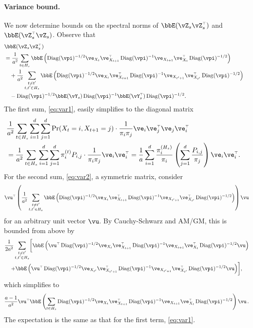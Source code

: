 \paragraph{Variance bound.}
We now determine bounds on the spectral norms of $\bbE(\vZ_s
\vZ_s^\t)$ and $\bbE(\vZ_s^\t \vZ_s)$.
Observe that
\begin{align}
  \lefteqn{
    \bbE(\vZ_s\vZ_s^\t)
  } \notag \\
  & =
  \frac1{a^2} \sum_{t \in H_s}
  \bbE\Parens{
    \Diag(\vpi)^{-1/2}
    \ve_{X_t} \ve_{X_{t+1}}^\t 
    \Diag(\vpi)^{-1}
    \ve_{X_{t+1}} \ve_{X_t}^\t
    \Diag(\vpi)^{-1/2}
  }
  \label{eq:var1}
  \\
  & \quad
  + \frac1{a^2} \sum_{ \substack{ t \neq t' \\ t,t'\in H_s} } 
  \bbE\Parens{
    \Diag(\vpi)^{-1/2}
    \ve_{X_t} \ve_{X_{t+1}}^\t 
    \Diag(\vpi)^{-1}
    \ve_{X_{t'+1}} \ve_{X_{t'}}^\t
    \Diag(\vpi)^{-1/2}
  }
  \label{eq:var2}
  \\
  & \quad
  - \Diag(\vpi)^{-1/2}
  \bbE(\vY_s)
  \Diag(\vpi)^{-1} 
  \bbE(\vY_s^\t)
  \Diag(\vpi)^{-1/2}
  .
  \label{eq:var3}
\end{align}
The first sum, \cref{eq:var1}, easily simplifies to the diagonal matrix
\begin{align*}
  \lefteqn{
    \frac1{a^2}
    \sum_{t \in H_s}
    \sum_{i=1}^d \sum_{j=1}^d \Pr(X_t = i, X_{t+1} = j) \cdot
    \frac{1}{\pi_i\pi_j} \ve_i\ve_j^\t\ve_j\ve_i^\t
  } \\
  & =
  \frac1{a^2}
  \sum_{t \in H_s}
  \sum_{i=1}^d \sum_{j=1}^d \pi_i^{(t)} P_{i,j} \cdot
  \frac{1}{\pi_i\pi_j} \ve_i\ve_i^\t
  =
  \frac1{a}
  \sum_{i=1}^d \frac{\pi_i^{(H_s)}}{\pi_i}
  \Parens{ \sum_{j=1}^d \frac{P_{i,j}}{\pi_j} }
   \ve_i \ve_i^\t
  .
\end{align*}
For the second sum, \cref{eq:var2},  a symmetric matrix, consider
\[
  \vu^\t
  \Parens{
    \frac1{a^2} \sum_{ \substack{ t \neq t' \\ t,t'\in H_s} } 
    \bbE\Parens{
      \Diag(\vpi)^{-1/2}
      \ve_{X_t} \ve_{X_{t+1}}^\t 
      \Diag(\vpi)^{-1}
      \ve_{X_{t'+1}} \ve_{X_{t'}}^\t
      \Diag(\vpi)^{-1/2}
    }
  } \vu
\]
for an arbitrary unit vector $\vu$.
By Cauchy-Schwarz and AM/GM, this is bounded from above by
\begin{multline*}
  \frac1{2a^2}
  \sum_{ \substack{ t \neq t' \\ t,t'\in H_s} }
  \biggl[
  \bbE\Parens{
    \vu^\t
    \Diag(\vpi)^{-1/2} \ve_{X_t} \ve_{X_{t+1}}^\t \Diag(\vpi)^{-1}
    \ve_{X_{t+1}} \ve_{X_t}^\t \Diag(\vpi)^{-1/2}
    \vu
  }
  \\
  +
  \bbE\Parens{
    \vu^\t
    \Diag(\vpi)^{-1/2} \ve_{X_{t'}} \ve_{X_{t'+1}}^\t \Diag(\vpi)^{-1}
    \ve_{X_{t'+1}} \ve_{X_{t'}}^\t \Diag(\vpi)^{-1/2}
    \vu
  }
  \biggr]
  ,
\end{multline*}
which simplifies to
\[
  \frac{a-1}{a^2}
  \vu^\t \bbE\Parens{
    \sum_{t \in H_s}
    \Diag(\vpi)^{-1/2} \ve_{X_t} \ve_{X_{t+1}}^\t \Diag(\vpi)^{-1}
    \ve_{X_{t+1}} \ve_{X_t}^\t \Diag(\vpi)^{-1/2}
  } \vu\,.
\]
The expectation is the same as that for the first term,
\cref{eq:var1}.

